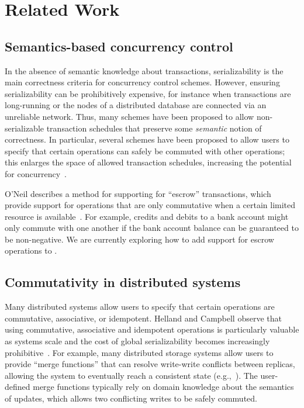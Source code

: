 \section{Related Work}
\label{sec:relwork}


\subsection{Semantics-based concurrency control}
In the absence of semantic knowledge about transactions, serializability is the
main correctness criteria for concurrency control schemes. However, ensuring
serializability can be prohibitively expensive, for instance when transactions
are long-running or the nodes of a distributed database are connected via an
unreliable network. Thus, many schemes have been proposed to allow
non-serializable transaction schedules that preserve some \emph{semantic} notion
of correctness. In particular, several schemes have been proposed to allow users
to specify that certain operations can safely be commuted with other operations;
this enlarges the space of allowed transaction schedules, increasing the
potential for concurrency~\cite{Farrag1989,Garcia-Molina1983,Weihl1988}.


O'Neil describes a method for supporting for ``escrow'' transactions, which
provide support for operations that are only commutative when a certain limited
resource is available~\cite{O'Neil1986}. For example, credits and debits to a
bank account might only commute with one another if the bank account balance can
be guaranteed to be non-negative. We are currently exploring how to add support
for escrow operations to \lang.


\subsection{Commutativity in distributed systems}
Many distributed systems allow users to specify that certain operations are
commutative, associative, or idempotent. Helland and Campbell observe that using
commutative, associative and idempotent operations is particularly valuable as
systems scale and the cost of global serializability becomes increasingly
prohibitive~\cite{Helland2009}. For example, many distributed storage systems
allow users to provide ``merge functions'' that can resolve write-write
conflicts between replicas, allowing the system to eventually reach a consistent
state (e.g.,~\cite{DeCandia2007,Lloyd2011,Power2010,Terry1995}). The
user-defined merge functions typically rely on domain knowledge about the
semantics of updates, which allows two conflicting writes to be safely commuted.

